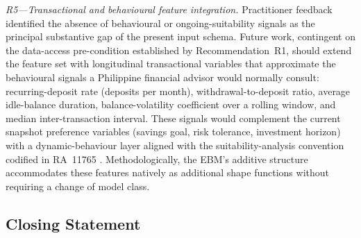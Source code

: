 \documentclass[journal]{./IEEE/IEEEtran}
\begin{document}
\textit{R5---Transactional and behavioural feature integration.}
Practitioner feedback identified the absence of behavioural or ongoing-suitability signals as the principal substantive gap of the present input schema. Future work, contingent on the data-access pre-condition established by Recommendation~R1, should extend the feature set with longitudinal transactional variables that approximate the behavioural signals a Philippine financial advisor would normally consult: recurring-deposit rate (deposits per month), withdrawal-to-deposit ratio, average idle-balance duration, balance-volatility coefficient over a rolling window, and median inter-transaction interval. These signals would complement the current snapshot preference variables (savings goal, risk tolerance, investment horizon) with a dynamic-behaviour layer aligned with the suitability-analysis convention codified in RA~11765 \cite{ref44}. Methodologically, the EBM's additive structure accommodates these features natively as additional shape functions without requiring a change of model class.

\subsection{Closing Statement}
\end{document}
